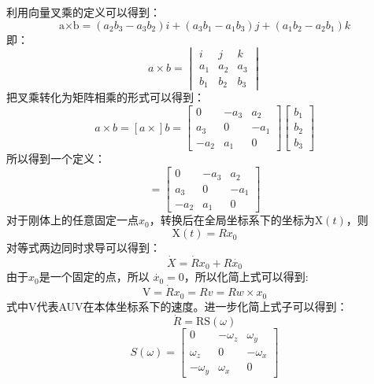 利用向量叉乘的定义可以得到：
\begin{equation}  
\text{a×b} =(a_2b_3-a_3b_2)i+(a_3b_1-a_1b_3)j+(a_1b_2-a_2b_1)k 
\end{equation}
即：
\begin{equation}  
    a\times b =\begin{vmatrix}i&j&k\\a_1&a_2&a_3\\b_1&b_2&b_3\end{vmatrix} 
 \end{equation}
 把叉乘转化为矩阵相乘的形式可以得到：
 \begin{equation}
    a\times b=[a\times]b=\begin{bmatrix}0&-a_3&a_2\\a_3&0&-a_1\\-a_2&a_1&0\end{bmatrix}\begin{bmatrix}b_1\\b_2\\b_3\end{bmatrix}
\end{equation}
 所以得到一个定义：
 \begin{equation}
    [a\times]=\begin{bmatrix}0&-a_3&a_2\\a_3&0&-a_1\\-a_2&a_1&0\end{bmatrix}
\end{equation}
对于刚体上的任意固定一点$x_0$，转换后在全局坐标系下的坐标为$\mathrm{X}(t)$，则
\begin{equation}
    \mathrm{X}(t)=Rx_0
\end{equation}
对等式两边同时求导可以得到：
\begin{equation}
    \dot{X}=\dot{R}x_0+R\dot{x_0}
\end{equation}
由于$x_0$是一个固定的点，所以 $\dot{x_0}=0$，所以化简上式可以得到:
\begin{equation}
    \mathrm{V}=\dot{R}x_0=Rv=Rw\times x_0
\end{equation}
式中$\mathrm{V}$代表AUV在本体坐标系下的速度。进一步化简上式子可以得到：
\begin{equation}
    \label{equ:3-14}
   \dot{R}=\mathrm{RS}(\omega)
\end{equation}
\begin{equation}
    S(\omega)=\begin{bmatrix}0&-\omega_z&\omega_y\\\omega_z&0&-\omega_x\\-\omega_y&\omega_x&0\end{bmatrix}
\end{equation}
